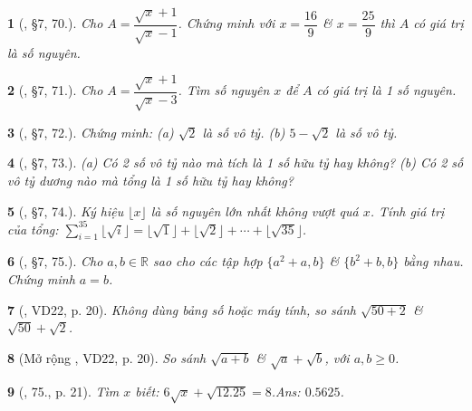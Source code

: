 \documentclass{article}
\newtheorem{baitoan}{}
\begin{document}
\begin{baitoan}[\cite{Binh_Toan_7_tap_1}, \S7, 70.]
	Cho $A = \dfrac{\sqrt{x} + 1}{\sqrt{x} - 1}$. Chứng minh với $x = \dfrac{16}{9}$ \& $x = \dfrac{25}{9}$ thì $A$ có giá trị là số nguyên.
\end{baitoan}

\begin{baitoan}[\cite{Binh_Toan_7_tap_1}, \S7, 71.]
	Cho $A = \dfrac{\sqrt{x} + 1}{\sqrt{x} - 3}$. Tìm số nguyên $x$ để $A$ có giá trị là 1 số nguyên.
\end{baitoan}

\begin{baitoan}[\cite{Binh_Toan_7_tap_1}, \S7, 72.]
	Chứng minh: (a) $\sqrt{2}$ là số vô tỷ. (b) $5 - \sqrt{2}$ là số vô tỷ.	
\end{baitoan}

\begin{baitoan}[\cite{Binh_Toan_7_tap_1}, \S7, 73.]
	(a) Có 2 số vô tỷ nào mà tích là 1 số hữu tỷ hay không? (b) Có 2 số vô tỷ dương nào mà tổng là 1 số hữu tỷ hay không?	
\end{baitoan}

\begin{baitoan}[\cite{Binh_Toan_7_tap_1}, \S7, 74.]
	Ký hiệu $\lfloor x\rfloor$ là số nguyên lớn nhất không vượt quá $x$. Tính giá trị của tổng: $\sum_{i=1}^{35} \lfloor\sqrt{i}\rfloor = \lfloor\sqrt{1}\rfloor + \lfloor\sqrt{2}\rfloor + \cdots + \lfloor\sqrt{35}\rfloor$.
\end{baitoan}

\begin{baitoan}[\cite{Binh_Toan_7_tap_1}, \S7, 75.]
	Cho $a,b\in\mathbb{R}$ sao cho các tập hợp $\{a^2 + a,b\}$ \& $\{b^2 + b,b\}$ bằng nhau. Chứng minh $a = b$.
\end{baitoan}

\begin{baitoan}[\cite{Tuyen_Toan_7}, VD22, p. 20]
	Không dùng bảng số hoặc máy tính, so sánh $\sqrt{50 + 2}$ \& $\sqrt{50} + \sqrt{2}$.
\end{baitoan}

\begin{baitoan}[Mở rộng \cite{Tuyen_Toan_7}, VD22, p. 20]
	So sánh $\sqrt{a + b}$ \& $\sqrt{a} + \sqrt{b}$, với $a,b\ge 0$.
\end{baitoan}

\begin{baitoan}[\cite{Tuyen_Toan_7}, 75., p. 21]
	Tìm $x$ biết: $6\sqrt{x} + \sqrt{12.25} = 8$.\hfill{\sf Ans:} $0.5625$.
\end{baitoan}
\end{document}
